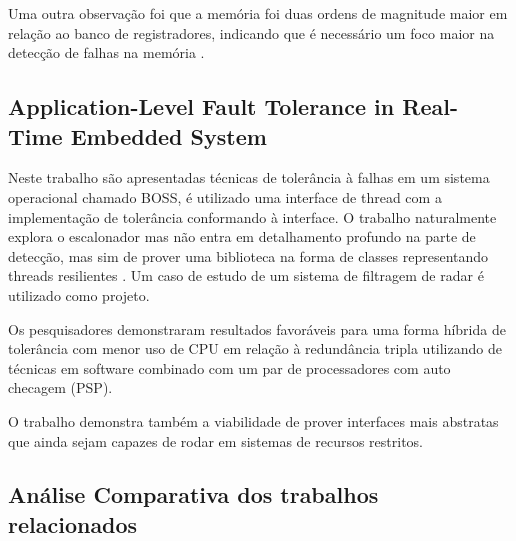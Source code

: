 Uma outra observação foi que a memória foi duas ordens de magnitude maior em relação ao banco de registradores, indicando que é necessário um foco maior na detecção de falhas na memória \cite{ReliabilityArmCortexUnderHeavyIons}.

\subsection{Application-Level Fault Tolerance in Real-Time Embedded System}

Neste trabalho são apresentadas técnicas de tolerância à falhas em um sistema operacional chamado BOSS, é utilizado uma interface de thread com a implementação de tolerância conformando à interface. O trabalho naturalmente explora o escalonador mas não entra em detalhamento profundo na parte de detecção, mas sim de prover uma biblioteca na forma de classes representando threads resilientes \cite{ApplicationLevelFT}. Um caso de estudo de um sistema de filtragem de radar é utilizado como projeto.

Os pesquisadores demonstraram resultados favoráveis para uma forma híbrida de tolerância com menor uso de CPU em relação à redundância tripla utilizando de técnicas em software combinado com um par de processadores com auto checagem (PSP).


O trabalho demonstra também a viabilidade de prover interfaces mais abstratas que ainda sejam capazes de rodar em sistemas de recursos restritos.

\subsection{Análise Comparativa dos trabalhos relacionados}

